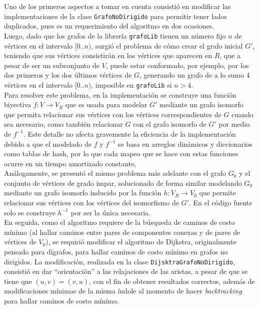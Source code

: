 \documentclass[11pt]{article}
\begin{document}
Uno de los primeros aspectos a tomar en cuenta consistió en
modificar las implementaciones de la clase \texttt{GrafoNoDirigido}
para permitir tener lados duplicados, pues es un requerimiento
del algoritmo en dos ocasiones. \\

Luego, dado que los grafos de la librería \texttt{grafoLib}
tienen un número fijo $n$ de vértices en el intervalo $[0 .. n)$,
surgió el problema de cómo crear el grafo inicial $G'$, teniendo
que sus vértices consistirán en los vértices que aparecen en $R$,
que a pesar de ser un subconjunto de $V$, puede estar conformado,
por ejemplo, por los dos primeros y los dos últimos vértices de
$G$, generando un grafo de a lo sumo 4 vértices en el intervalo 
$[0..n)$, imposible en \texttt{grafoLib} si $n > 4$. \\

Para resolver este problema, en la implementación se construye
una función biyectiva $f: V \rightarrow V_R $ que es usada para
modelar $G'$ mediante un grafo isomorfo que permita relacionar
sus vértices con los vértices correspondientes de $G$
cuando sea necesario, como también relacionar $G$ con el grafo
isomorfo de $G'$ por medio de $f^{-1}$. Este detalle no afecta
gravemente la eficiencia de la implementación debido a que el 
modelado de $f$ y $f^{-1}$ se basa en arreglos dinámicos y 
diccionarios como tablas de hash, por lo que cada mapeo que
se hace con estas funciones ocurre en un tiempo amortizado
constante, \\

Análogamente, se presentó el mismo problema más adelante
con el grafo $G_0$ y el conjunto de vértices de grado impar,
solucionado de forma similar modelando $G_0$ mediante un grafo
isomorfo inducido por la función $h: V_R \rightarrow V_0 $ que
permite relacionar sus vértices con los vértices del isomorfismo
de $G'$. En el código fuente solo se construye $ h^{-1} $ por ser
la única necesaria. \\

En seguida, como el algoritmo requiere de la búsqueda de 
caminos de costo mínimo (al hallar caminos entre pares de componentes
conexas y de pares de vértices de $V_0$), se requirió modificar
el algoritmo de Dijkstra, originalmente pensado para dígrafos,
para hallar caminos de costo mínimo en grafos no dirigidos. 
La modificación, realizada en la clase \texttt{DijsktraGrafoNoDirigido},
consistió en dar ``orientación'' a las relajaciones de las aristas,
a pesar de que se tiene que $(u, v) = (v, u)$, con el fin de obtener
resultados correctos, además de modificaciones mínimas de la
misma índole al momento de hacer \emph{backtracking} para hallar
caminos de costo mínimo. \\
\end{document}
